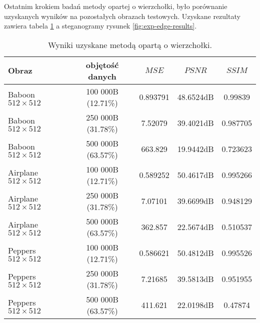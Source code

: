 {{{            %
            Ostatnim krokiem badań metody opartej o wierzchołki, było porównanie uzyskanych wyników na pozostałych
            obrazach testowych. Uzyskane rezultaty zawiera tabela \ref{tab:exp-edge-results} a steganogramy rysunek
            \ref{fig:exp-edge-results}.

            \begin{table}
                \centering
                \begin{tabular}{ |l|c|c c c| }
                    \hline
                    Obraz & objętość danych & $MSE$ & $PSNR$ & $SSIM$ \\
                    \hline
                    Baboon {\footnotesize $512 \times 512$}   & 100 000B (12.71\%) & 0.893791 & 48.6524dB & 0.99839 \\
                    Baboon {\footnotesize $512 \times 512$}   & 250 000B (31.78\%) & 7.52079 & 39.4021dB & 0.987705 \\
                    Baboon {\footnotesize $512 \times 512$}   & 500 000B (63.57\%) & 663.829 & 19.9442dB & 0.723623 \\
                    Airplane {\footnotesize $512 \times 512$} & 100 000B (12.71\%) & 0.589252 & 50.4617dB & 0.995266 \\
                    Airplane {\footnotesize $512 \times 512$} & 250 000B (31.78\%) & 7.07101 & 39.6699dB & 0.948129 \\
                    Airplane {\footnotesize $512 \times 512$} & 500 000B (63.57\%) & 362.857 & 22.5674dB & 0.510537 \\
                    Peppers {\footnotesize $512 \times 512$}  & 100 000B (12.71\%) & 0.586621 & 50.4812dB & 0.995526 \\
                    Peppers {\footnotesize $512 \times 512$}  & 250 000B (31.78\%) & 7.21685 & 39.5813dB & 0.951955 \\
                    Peppers {\footnotesize $512 \times 512$}  & 500 000B (63.57\%) & 411.621 & 22.0198dB & 0.47874 \\
                    \hline
                \end{tabular}
                \caption{Wyniki uzyskane metodą opartą o wierzchołki.}
                \label{tab:exp-edge-results}
            \end{table}

}}}
